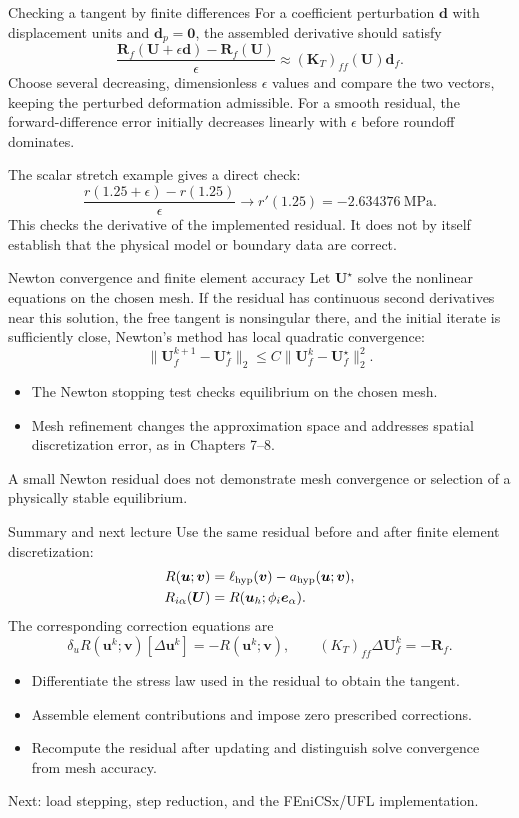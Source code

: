 \documentclass[11pt,aspectratio=169]{beamer}
\newcommand{\bu}{\bm u}
\newcommand{\bv}{\bm v}
\newcommand{\bU}{\bm U}
\newcommand{\bR}{\bm R}
\newcommand{\bK}{\bm K}
\begin{document}
\begin{frame}{Checking a tangent by finite differences}
For a coefficient perturbation $\bm d$ with displacement units and
$\bm d_p=\bm0$,
the assembled derivative should satisfy
\[
\frac{\bR_f(\bU+\epsilon\bm d)-\bR_f(\bU)}{\epsilon}
\approx(\bK_T)_{ff}(\bU)\bm d_f.
\]
Choose several decreasing, dimensionless $\epsilon$ values and compare the
two vectors, keeping the perturbed deformation admissible.
For a smooth residual, the forward-difference error initially decreases
linearly with $\epsilon$ before roundoff dominates.

The scalar stretch example gives a direct check:
\[
\frac{r(1.25+\epsilon)-r(1.25)}{\epsilon}
\longrightarrow r'(1.25)=-2.634376\ \mathrm{MPa}.
\]
This checks the derivative of the implemented residual. It does not by
itself establish that the physical model or boundary data are correct.
\end{frame}

\begin{frame}{Newton convergence and finite element accuracy}
Let $\bU^\star$ solve the nonlinear equations on the chosen mesh.
If the residual has continuous second derivatives near this solution,
the free tangent is nonsingular there, and the initial iterate is sufficiently
close, Newton's method has local quadratic convergence:
\[
\|\bU_f^{k+1}-\bU_f^\star\|_2
\le C\|\bU_f^k-\bU_f^\star\|_2^2.
\]
\begin{itemize}
\item The Newton stopping test checks equilibrium on the chosen mesh.
\item Mesh refinement changes the approximation space and addresses spatial
discretization error, as in Chapters 7--8.
\end{itemize}
A small Newton residual does not demonstrate mesh convergence or selection
of a physically stable equilibrium.
\end{frame}

\begin{frame}{Summary and next lecture}
Use the same residual before and after finite element discretization:
\[
\begin{aligned}
R(\bu;\bv)&=\ell_{\rm hyp}(\bv)-a_{\rm hyp}(\bu;\bv),\\
R_{i\alpha}(\bU)&=R(\bu_h;\phi_i\bm e_\alpha).
\end{aligned}
\]
The corresponding correction equations are
\[
\boxed{\delta_uR(\bu^k;\bv)[\Delta\bu^k]=-R(\bu^k;\bv),
\qquad (K_T)_{ff}\Delta\bU_f^k=-\bR_f.}
\]
\begin{itemize}
\item Differentiate the stress law used in the residual to obtain the tangent.
\item Assemble element contributions and impose zero prescribed corrections.
\item Recompute the residual after updating and distinguish solve convergence
from mesh accuracy.
\end{itemize}
Next: load stepping, step reduction, and the FEniCSx/UFL implementation.
\end{frame}
\end{document}
